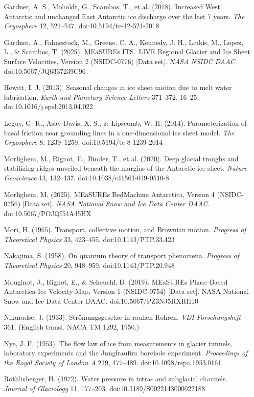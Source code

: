 \documentclass[11pt]{article}
\begin{document}
Gardner, A. S., Moholdt, G., Scambos, T., et al. (2018). Increased West Antarctic and unchanged East Antarctic ice discharge over the last 7 years. \emph{The Cryosphere} 12, 521–547. doi:10.5194/tc-12-521-2018


Gardner, A., Fahnestock, M., Greene, C. A., Kennedy, J. H., Liukis, M., Lopez, L., \& Scambos, T. (2025). MEaSUREs ITS\_LIVE Regional Glacier and Ice Sheet Surface Velocities, Version 2 (NSIDC-0776) [Data set]. \emph{NASA NSIDC DAAC.} doi:10.5067/JQ6337239C96


Hewitt, I. J. (2013). Seasonal changes in ice sheet motion due to melt water lubrication. \emph{Earth and Planetary Science Letters} 371–372, 16–25. doi:10.1016/j.epsl.2013.04.022


Leguy, G. R., Asay-Davis, X. S., \& Lipscomb, W. H. (2014). Parameterization of basal friction near grounding lines in a one-dimensional ice sheet model. \emph{The Cryosphere} 8, 1239–1259. doi:10.5194/tc-8-1239-2014


Morlighem, M., Rignot, E., Binder, T., et al. (2020). Deep glacial troughs and stabilizing ridges unveiled beneath the margins of the Antarctic ice sheet. \emph{Nature Geoscience} 13, 132–137. doi:10.1038/s41561-019-0510-8


Morlighem, M. (2025). MEaSUREs BedMachine Antarctica, Version 4 (NSIDC-0756) [Data set]. \emph{NASA National Snow and Ice Data Center DAAC.} doi:10.5067/POJQI54A45HX


Mori, H. (1965). Transport, collective motion, and Brownian motion. \emph{Progress of Theoretical Physics} 33, 423–455. doi:10.1143/PTP.33.423


Nakajima, S. (1958). On quantum theory of transport phenomena. \emph{Progress of Theoretical Physics} 20, 948–959. doi:10.1143/PTP.20.948


Mouginot, J., Rignot, E., \& Scheuchl, B. (2019). MEaSUREs Phase-Based Antarctica Ice Velocity Map, Version 1 (NSIDC-0754) [Data set]. NASA National Snow and Ice Data Center DAAC. doi:10.5067/PZ3NJ5RXRH10

Nikuradse, J. (1933). Strömungsgesetze in rauhen Rohren. \emph{VDI-Forschungsheft} 361. (English transl. NACA TM 1292, 1950.)

Nye, J. F. (1953). The flow law of ice from measurements in glacier tunnels, laboratory experiments and the Jungfraufirn borehole experiment. \emph{Proceedings of the Royal Society of London A} 219, 477–489. doi:10.1098/rspa.1953.0161


Röthlisberger, H. (1972). Water pressure in intra- and subglacial channels. \emph{Journal of Glaciology} 11, 177–203. doi:10.3189/S0022143000022188
\end{document}
